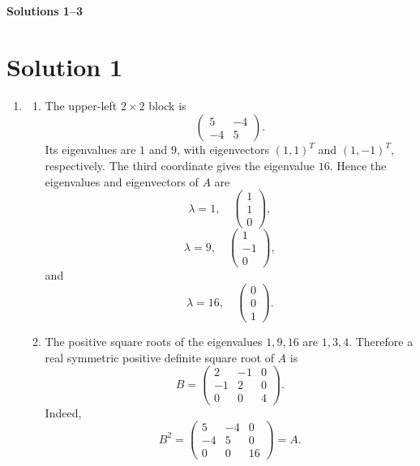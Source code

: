 \documentclass[10pt,a4paper]{article}
\begin{document}
\newpage

\begin{center}
  {\Large \textbf{Solutions 1--3}}
\end{center}

\section*{Solution 1}

\begin{enumerate}
  \item
        \begin{enumerate}
          \item The upper-left $2\times2$ block is
                \[
                  \begin{pmatrix}
                    5&-4\\
                    -4&5
                  \end{pmatrix}.
                \]
                Its eigenvalues are $1$ and $9$, with eigenvectors $(1,1)^T$ and $(1,-1)^T$, respectively. The third coordinate gives the eigenvalue $16$. Hence the eigenvalues and eigenvectors of $A$ are
                \[
                  \boxed{\lambda=1,\quad
                  \begin{pmatrix}1\\1\\0\end{pmatrix}},
                \]
                \[
                  \boxed{\lambda=9,\quad
                  \begin{pmatrix}1\\-1\\0\end{pmatrix}},
                \]
                and
                \[
                  \boxed{\lambda=16,\quad
                  \begin{pmatrix}0\\0\\1\end{pmatrix}}.
                \]

          \item The positive square roots of the eigenvalues $1,9,16$ are $1,3,4$. Therefore a real symmetric positive definite square root of $A$ is
                \[
                  \boxed{
                  B=
                  \begin{pmatrix}
                    2&-1&0\\
                    -1&2&0\\
                    0&0&4
                  \end{pmatrix}.}
                \]
                Indeed,
                \[
                  B^2=
                  \begin{pmatrix}
                    5&-4&0\\
                    -4&5&0\\
                    0&0&16
                  \end{pmatrix}
                  =A.
                \]
        \end{enumerate}


\end{enumerate}
\end{document}
